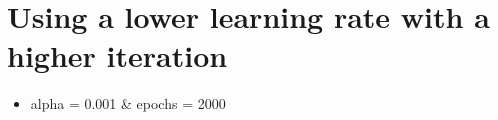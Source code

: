 \documentclass[11pt]{article}
\providecommand{\tightlist}{%
      \setlength{\itemsep}{0pt}\setlength{\parskip}{0pt}}
\begin{document}
    \begin{center}
    \end{center}
    { \hspace*{\fill} \\}
    
    \section{Using a lower learning rate with a higher
iteration}\label{using-a-lower-learning-rate-with-a-higher-iteration}

\begin{itemize}
\tightlist
\item
  alpha = 0.001 \& epochs = 2000
\end{itemize}
\end{document}
